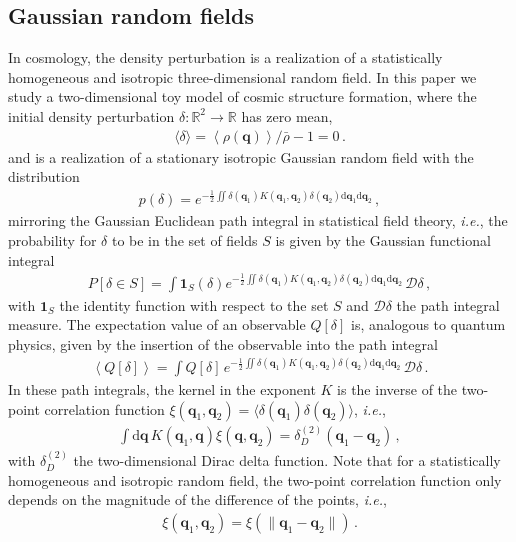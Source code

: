 \documentclass[a4paper, 11pt]{article}
\begin{document}
\subsection{Gaussian random fields}
In cosmology, the density perturbation is a realization of a statistically homogeneous and isotropic three-dimensional random field. In this paper we study a two-dimensional toy model of cosmic structure formation, where the initial density perturbation $\delta:\mathbb{R}^2 \to \mathbb{R}$ has zero mean,
\begin{align}
\langle \delta \rangle 
= \left\langle \rho(\bm{q}) \right\rangle /\bar{\rho} - 1 =0\,.
\end{align} 
and is a realization of a stationary isotropic Gaussian random field with the distribution
\begin{align}
p(\delta) = e^{-\frac{1}{2} \iint \delta(\bm{q}_1) K(\bm{q}_1,\bm{q}_2) \delta(\bm{q}_2) \mathrm{d}\bm{q}_1 \mathrm{d}\bm{q}_2}\,,
\end{align}
mirroring the Gaussian Euclidean path integral in statistical field theory, \textit{i.e.}, the probability for $\delta$ to be in the set of fields $S$ is given by the Gaussian functional integral
\begin{align}
P[\delta \in S] = \int \bm{1}_S(\delta) e^{-\frac{1}{2} \iint \delta(\bm{q}_1) K(\bm{q}_1,\bm{q}_2) \delta(\bm{q}_2) \mathrm{d}\bm{q}_1 \mathrm{d}\bm{q}_2}\,\mathcal{D}\delta\,,
\end{align}
with $\bm{1}_S$ the identity function with respect to the set $S$ and $\mathcal{D}\delta$ the path integral measure. The expectation value of an observable $Q[\delta]$ is, analogous to quantum physics, given by the insertion of the observable into the path integral
\begin{align} 
\left\langle Q[\delta] \right\rangle = \int Q[\delta]\, e^{-\frac{1}{2} \iint \delta(\bm{q}_1) K(\bm{q}_1,\bm{q}_2) \delta(\bm{q}_2) \mathrm{d}\bm{q}_1 \mathrm{d}\bm{q}_2}\,\mathcal{D}\delta\,.
\end{align}
In these path integrals, the kernel in the exponent $K$ is the inverse of the two-point correlation function $\xi(\bm{q}_1,\bm{q}_2) = \langle \delta(\bm{q}_1) \delta(\bm{q}_2)\rangle$, \textit{i.e.},
\begin{align}
\int \mathrm{d}\bm{q}\, K(\bm{q}_1,\bm{q}) \xi(\bm{q},\bm{q}_2) = \delta_D^{(2)}(\bm{q}_1-\bm{q}_2)\,,
\end{align}
with $\delta_D^{(2)}$ the two-dimensional Dirac delta function. Note that for a statistically homogeneous and isotropic random field, the two-point correlation function only depends on the magnitude of the difference of the points, \textit{i.e.},
\begin{align}
\xi(\bm{q}_1, \bm{q}_2) = \xi(\|\bm{q}_1-\bm{q}_2\|)\,.
\end{align} 
\end{document}
